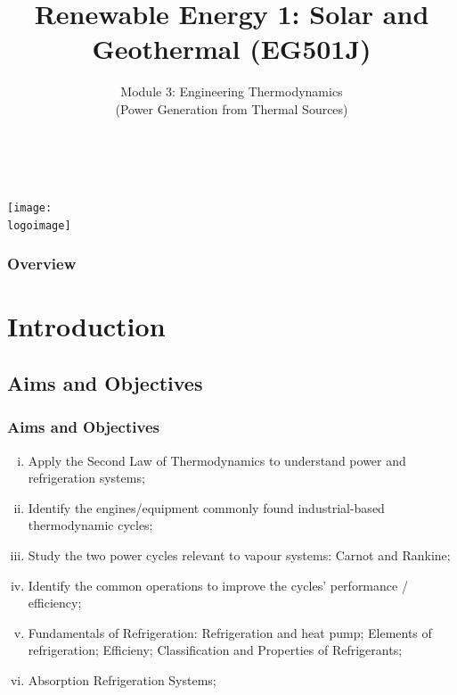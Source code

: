 \documentclass[10pt,compress,handout,ignorenonframetext]{beamer}
\institute{School of Engineering}
\title{Renewable Energy 1: Solar and Geothermal (EG501J)}
\subtitle{Module 3: Engineering Thermodynamics \\ (Power Generation from Thermal Sources)}
\date[]{}
\author[\shortname]{%
  \fullname\\\ttfamily{\emailaddress}
}
\newcommand{\logoimage}{../FigBanner/UoAHorizBanner}
\begin{document}
\begin{frame}
  \titlepage
  \vfill%
  \begin{center}
    \texttt{[image: \\logoimage]}
  \end{center}
\end{frame}


\begin{frame}
\frametitle{Overview} %
\tableofcontents %
\end{frame}





\section{Introduction}

 \subsection{Aims and Objectives}
   \begin{frame}
     \frametitle{Aims and Objectives}
     \begin{enumerate}[(i)]
       \item <1-> Apply the Second Law of Thermodynamics to understand power and refrigeration systems;
       \item <1-> Identify the engines/equipment commonly found industrial-based thermodynamic cycles; 
       \item <1-> Study the two power cycles relevant to vapour systems: Carnot and Rankine; 
       \item <1-> Identify the common operations to improve the cycles' performance / efficiency;
       \item <1-> Fundamentals of Refrigeration: Refrigeration and heat pump; Elements of refrigeration; Efficieny; Classification and Properties of Refrigerants;
       \item <1-> Absorption Refrigeration Systems;
 \end{enumerate}
   \end{frame}
\end{document}
